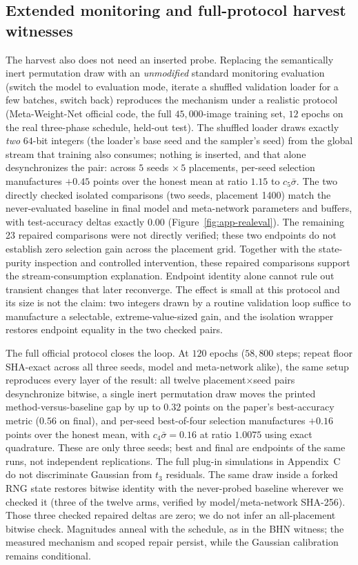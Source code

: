 \documentclass[10pt,letterpaper]{article}
\theoremstyle{remark}
\begin{document}
\subsection{Extended monitoring and full-protocol harvest witnesses}
\label{sec:extended-harvest}

The harvest also does not need an inserted probe. Replacing the semantically
inert permutation draw with an \emph{unmodified} standard monitoring
evaluation (switch the model to evaluation mode, iterate a shuffled
validation loader for a few batches, switch back) reproduces the mechanism
under a realistic protocol (Meta-Weight-Net official code, the full
$45{,}000$-image training set, $12$ epochs on the real three-phase schedule,
held-out test). The shuffled loader draws
exactly \emph{two} $64$-bit integers (the loader's base seed and the sampler's
seed) from the global stream that training also consumes; nothing is inserted,
and that alone desynchronizes the pair: across $5$ seeds $\times\,5$ placements, per-seed
selection manufactures $+0.45$ points over the honest mean at ratio $1.15$ to
$c_5\bar\sigma$. The two directly checked isolated comparisons (two seeds,
placement 1400) match the never-evaluated baseline in final model and
meta-network parameters and buffers, with test-accuracy deltas exactly
$0.00$ (Figure~\ref{fig:app-realeval}). The remaining 23 repaired comparisons
were not directly verified; these two endpoints do not establish zero
selection gain across the placement grid. Together with
the state-purity inspection and controlled intervention, these repaired
comparisons support the stream-consumption explanation. Endpoint identity
alone cannot rule out transient changes that later reconverge. The effect is small at this
protocol and its size is not the claim: two integers drawn by a routine
validation loop suffice to manufacture a selectable, extreme-value-sized gain,
and the isolation wrapper restores endpoint equality in the two checked pairs.

The full official protocol closes the loop. At $120$ epochs ($58{,}800$
steps; repeat floor SHA-exact across all three seeds, model and
meta-network alike), the same setup reproduces every layer of the result: all twelve
placement$\times$seed pairs desynchronize bitwise, a single inert
permutation draw moves the printed method-versus-baseline gap by up
to $0.32$ points on the paper's best-accuracy metric ($0.56$ on final),
and per-seed best-of-four selection manufactures $+0.16$ points over the
honest mean,
with $c_4\bar\sigma = 0.16$ at ratio $1.0075$ using exact quadrature.
These are only three seeds; best and final are endpoints of the same runs,
not independent replications. The full plug-in simulations in Appendix~C do not
discriminate Gaussian from $t_3$ residuals. The same draw
inside a forked RNG state restores bitwise identity with the never-probed
baseline wherever we checked it (three of the twelve arms, verified by
model/meta-network SHA-256). Those three checked repaired deltas are zero;
we do not infer an all-placement bitwise check. Magnitudes anneal
with the schedule, as in the BHN witness; the measured mechanism and scoped
repair persist, while the Gaussian calibration remains conditional.
\end{document}
